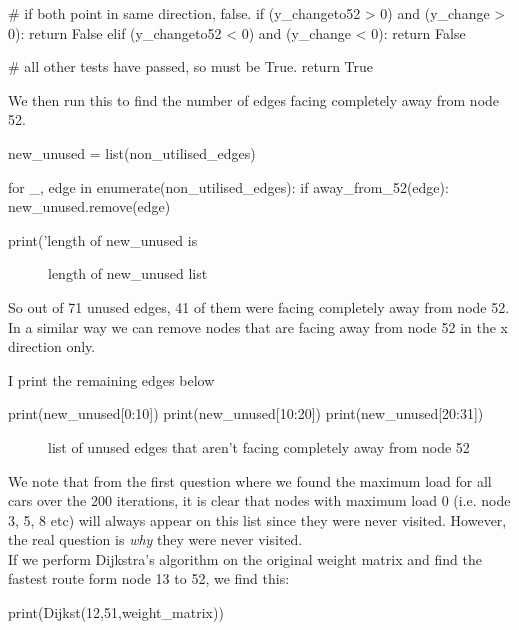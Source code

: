 \documentclass[paper=a4, fontsize=12pt]{scrartcl} %
\numberwithin{equation}{section}       %
\numberwithin{figure}{section}         %
\numberwithin{table}{section}          %
\begin{document}
\begin{enumerate}
\begin{python}
    # if both point in same direction, false.
    if (y_changeto52 > 0) and (y_change > 0):
        return False
    elif (y_changeto52 < 0) and (y_change < 0):
        return False

    # all other tests have passed, so must be True.
    return True  
\end{python}

We then run this to find the number of edges facing completely away from node 52.

\begin{python}
new_unused = list(non_utilised_edges)

for _, edge in enumerate(non_utilised_edges):
	if away_from_52(edge):
	new_unused.remove(edge)

print('length of new_unused is %
\end{python}

\begin{figure}[h]
\caption{length of new\_unused list}
\centering

\end{figure}

So out of 71 unused edges, 41 of them were facing completely away from node 52. In a similar way we can remove nodes that are facing away from node 52 in the x direction only. 

I print the remaining edges below

\begin{python}
    print(new_unused[0:10])
    print(new_unused[10:20])
    print(new_unused[20:31])
\end{python}

\begin{figure}[h]
\caption{list of unused edges that aren't facing completely away from node 52}
\centering
\end{figure}



We note that from the first question where we found the maximum load for all cars over the 200 iterations, it is clear that nodes with maximum load 0 (i.e. node 3, 5, 8 etc) will always appear on this list since they were never visited. However, the real question is \textit{why} they were never visited. \\

If we perform Dijkstra's algorithm on the original weight matrix and find the fastest route form node 13 to 52, we find this:

\begin{python}
print(Dijkst(12,51,weight_matrix))
\end{python}


\end{enumerate}
\end{document}
